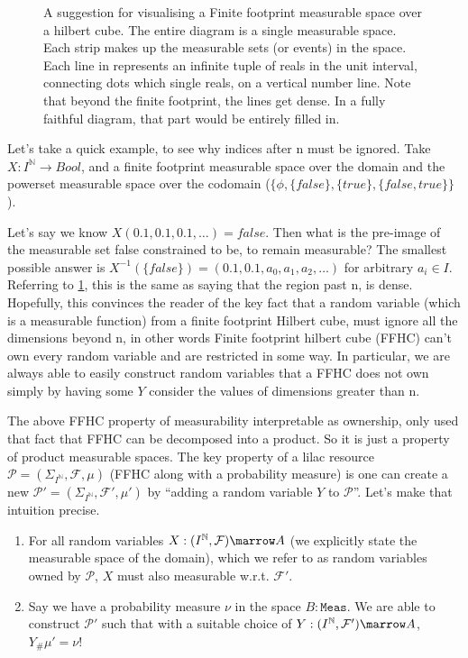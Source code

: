 \begin{figure}[tb]
  \centering

\caption{A suggestion for visualising a Finite footprint measurable space over a hilbert cube. The entire diagram is a single measurable space. Each strip
makes up the measurable sets (or events) in the space. Each line in represents an infinite tuple of reals in the unit interval, connecting dots which single reals,
on a vertical number line. Note that beyond the finite footprint, the lines get dense. In a fully faithful diagram, that part would be entirely filled in.}
\label{fig:hc}
\end{figure}


Let's take a quick example, to see why indices after n must be ignored. Take $X : I^\mathbb{N} \to Bool$, and a finite footprint measurable space over the domain
and the powerset measurable space over the codomain ($\{\phi, \{false\}, \{true\}, \{false, true\}\}$).

Let's say we know $X(0.1, 0.1, 0.1, \ldots) = false$. 
Then what is the pre-image of the measurable set {false} constrained to be, to remain measurable? The smallest possible answer is $X^{-1} (\{false\}) = (0.1, 0.1, a_0, a_1, a_2, \ldots)$
for arbitrary $a_i \in I$. Referring to \ref{fig:hc}, this is the same as saying that the region past n, is dense. Hopefully, this convinces the reader
of the key fact that a random variable (which is a measurable function) from a finite footprint Hilbert cube, must ignore all the dimensions beyond n, in
other words Finite footprint hilbert cube (FFHC) can't own every random variable and are restricted in some way. In particular, we are always able to easily construct
random variables that a FFHC does not own simply by having some $Y$ consider the values of dimensions greater than n.

The above FFHC property of measurability interpretable as ownership, only used that fact that FFHC can be decomposed into a product. So it is just
a property of product measurable spaces. The key property of a lilac resource $\mathcal{P} = (\Sigma_{I^\mathbb{N}}, \mathcal{F}, \mu)$ (FFHC along with a probability measure) is one can create
a new $\mathcal{P'} = (\Sigma_{I^\mathbb{N}}, \mathcal{F'}, \mu')$ by ``adding a random variable $Y$ to $\mathcal{P}$''.
Let's make that intuition precise.

\begin{enumerate}
\item For all random variables $X : (I^\mathbb{N}, \mathcal{F}) \marrow A$ (we explicitly state the measurable space of
the domain), which we refer to as random variables owned by $\mathcal{P}$, $X$ must also measurable w.r.t. $\mathcal{F'}$.
\item Say we have a probability
measure $\nu$ in the space $B : \texttt{Meas}$. We are able to construct $\mathcal{P'}$ such that with a suitable choice of $Y : (I^\mathbb{N}, \mathcal{F'}) \marrow A$,
$Y_\#\mu' = \nu$!
\end{enumerate}

